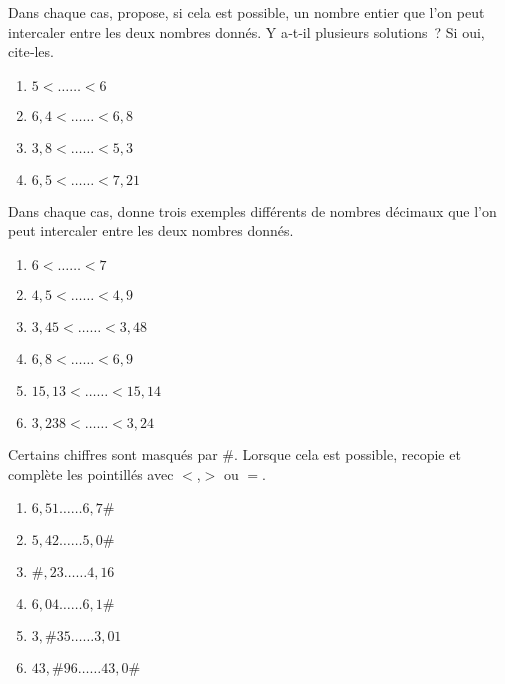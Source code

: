 \begin{exercice}
Dans chaque cas, propose, si cela est possible, un nombre entier que l'on peut intercaler entre les deux nombres donnés. 
Y a‑t‑il plusieurs solutions ? Si oui, cite‑les.
\begin{enumerate}
 \item $5 < …… < 6$
 \item $6,4 < …… < 6,8$
 \item $3,8 < …… < 5,3$
 \item $6,5 < …… < 7,21$ 
 \end{enumerate}
\end{exercice}


\begin{exercice}
Dans chaque cas, donne trois exemples différents de nombres décimaux que l'on peut intercaler entre les deux nombres donnés.
\begin{enumerate}
 \item $6 < …… < 7$
 \item $4,5 < …… < 4,9$
 \item $3,45 < …… < 3,48$
 \item $6,8 < …… < 6,9$
 \item $15,13 < …… < 15,14$
 \item $3,238 < …… < 3,24$ 
 \end{enumerate}
\end{exercice}


\begin{exercice}
Certains chiffres sont masqués par \#. Lorsque cela est possible, recopie et complète les pointillés avec $<$,$>$ ou $=$.
\begin{enumerate} 
 \item $6,51 …… 6,7\#$
 \item $5,42 …… 5,0\#$
 \item $\#,23 …… 4,16$
 \item $6,04 …… 6,1\#$
 \item $3,\#35 …… 3,01$
 \item $43,\#96 …… 43,0\#$ 
 \end{enumerate}
\end{exercice}


